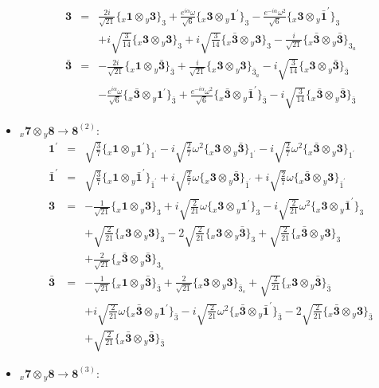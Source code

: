 \documentclass[english]{article}
\newcommand{\rep}[1]{\mathbf{#1}}
\newcommand{\repx}[2]{{}_{#2}\mathbf{#1}}
\newcommand{\subcg}[3]{\big\{ \repx{#1}{x}\otimes\repx{#2}{y}\big\}^{}_{#3}}
\begin{document}
\begin{itemize}
\begin{eqnarray*}
\rep{3} &=& \frac{2 i}{\sqrt{21}}\subcg{1}{3}{3}+\frac{e^{i \alpha } \omega }{\sqrt{6}}\subcg{3}{1^{\prime}}{3}-\frac{e^{-i \alpha } \omega ^2}{\sqrt{6}}\subcg{3}{\bar{1}^{\prime}}{3} \\ 
 & & +i \sqrt{\frac{3}{14}}\subcg{3}{3}{3}+i \sqrt{\frac{3}{14}}\subcg{\bar{3}}{3}{3}-\frac{i}{\sqrt{21}}\subcg{\bar{3}}{\bar{3}}{3_{a}}
\\
\rep{\bar{3}} &=& -\frac{2 i}{\sqrt{21}}\subcg{1}{\bar{3}}{\bar{3}}+\frac{i}{\sqrt{21}}\subcg{3}{3}{\bar{3}_{a}}-i \sqrt{\frac{3}{14}}\subcg{3}{\bar{3}}{\bar{3}} \\ 
 & & -\frac{e^{i \alpha } \omega }{\sqrt{6}}\subcg{\bar{3}}{1^{\prime}}{\bar{3}}+\frac{e^{-i \alpha } \omega ^2}{\sqrt{6}}\subcg{\bar{3}}{\bar{1}^{\prime}}{\bar{3}}-i \sqrt{\frac{3}{14}}\subcg{\bar{3}}{\bar{3}}{\bar{3}}
\end{eqnarray*}
\item $\repx{7}{x}\otimes\repx{8}{y}\to\rep{8}^{(2)}$:
\begin{eqnarray*}
\rep{1^{\prime}} &=& \sqrt{\frac{3}{7}}\subcg{1}{1^{\prime}}{1^{\prime}}-i \sqrt{\frac{2}{7}} \omega ^2\subcg{3}{\bar{3}}{1^{\prime}}-i \sqrt{\frac{2}{7}} \omega ^2\subcg{\bar{3}}{3}{1^{\prime}}
\\
\rep{\bar{1}^{\prime}} &=& \sqrt{\frac{3}{7}}\subcg{1}{\bar{1}^{\prime}}{\bar{1}^{\prime}}+i \sqrt{\frac{2}{7}} \omega\subcg{3}{\bar{3}}{\bar{1}^{\prime}}+i \sqrt{\frac{2}{7}} \omega\subcg{\bar{3}}{3}{\bar{1}^{\prime}}
\\
\rep{3} &=& -\frac{1}{\sqrt{21}}\subcg{1}{3}{3}+i \sqrt{\frac{2}{21}} \omega\subcg{3}{1^{\prime}}{3}-i \sqrt{\frac{2}{21}} \omega ^2\subcg{3}{\bar{1}^{\prime}}{3} \\ 
 & & +\sqrt{\frac{2}{21}}\subcg{3}{3}{3}-2 \sqrt{\frac{2}{21}}\subcg{3}{\bar{3}}{3}+\sqrt{\frac{2}{21}}\subcg{\bar{3}}{3}{3} \\ 
 & & +\frac{2}{\sqrt{21}}\subcg{\bar{3}}{\bar{3}}{3_{s}}
\\
\rep{\bar{3}} &=& -\frac{1}{\sqrt{21}}\subcg{1}{\bar{3}}{\bar{3}}+\frac{2}{\sqrt{21}}\subcg{3}{3}{\bar{3}_{s}}+\sqrt{\frac{2}{21}}\subcg{3}{\bar{3}}{\bar{3}} \\ 
 & & +i \sqrt{\frac{2}{21}} \omega\subcg{\bar{3}}{1^{\prime}}{\bar{3}}-i \sqrt{\frac{2}{21}} \omega ^2\subcg{\bar{3}}{\bar{1}^{\prime}}{\bar{3}}-2 \sqrt{\frac{2}{21}}\subcg{\bar{3}}{3}{\bar{3}} \\ 
 & & +\sqrt{\frac{2}{21}}\subcg{\bar{3}}{\bar{3}}{\bar{3}}
\end{eqnarray*}
\item $\repx{7}{x}\otimes\repx{8}{y}\to\rep{8}^{(3)}$:

\end{itemize}
\end{document}
